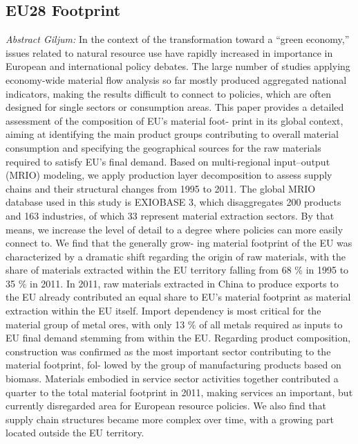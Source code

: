 \documentclass[
]{book}
\begin{document}
\hypertarget{eu28-footprint}{%
\subsection{EU28 Footprint}\label{eu28-footprint}}

\emph{Abstract Giljum:}
In the context of the transformation toward a ``green economy,'' issues related to natural
resource use have rapidly increased in importance in European and international policy
debates. The large number of studies applying economy-wide material flow analysis
so far mostly produced aggregated national indicators, making the results difficult to
connect to policies, which are often designed for single sectors or consumption areas.
This paper provides a detailed assessment of the composition of EU's material foot-
print in its global context, aiming at identifying the main product groups contributing
to overall material consumption and specifying the geographical sources for the raw
materials required to satisfy EU's final demand. Based on multi-regional input--output
(MRIO) modeling, we apply production layer decomposition to assess supply chains
and their structural changes from 1995 to 2011. The global MRIO database used in this
study is EXIOBASE 3, which disaggregates 200 products and 163 industries, of which 33
represent material extraction sectors. By that means, we increase the level of detail to
a degree where policies can more easily connect to. We find that the generally grow-
ing material footprint of the EU was characterized by a dramatic shift regarding the
origin of raw materials, with the share of materials extracted within the EU territory
falling from 68 \% in 1995 to 35 \% in 2011. In 2011, raw materials extracted in China to
produce exports to the EU already contributed an equal share to EU's material footprint
as material extraction within the EU itself. Import dependency is most critical for the
material group of metal ores, with only 13 \% of all metals required as inputs to EU final
demand stemming from within the EU. Regarding product composition, construction
was confirmed as the most important sector contributing to the material footprint, fol-
lowed by the group of manufacturing products based on biomass. Materials embodied
in service sector activities together contributed a quarter to the total material footprint
in 2011, making services an important, but currently disregarded area for European
resource policies. We also find that supply chain structures became more complex over
time, with a growing part located outside the EU territory.
\end{document}
